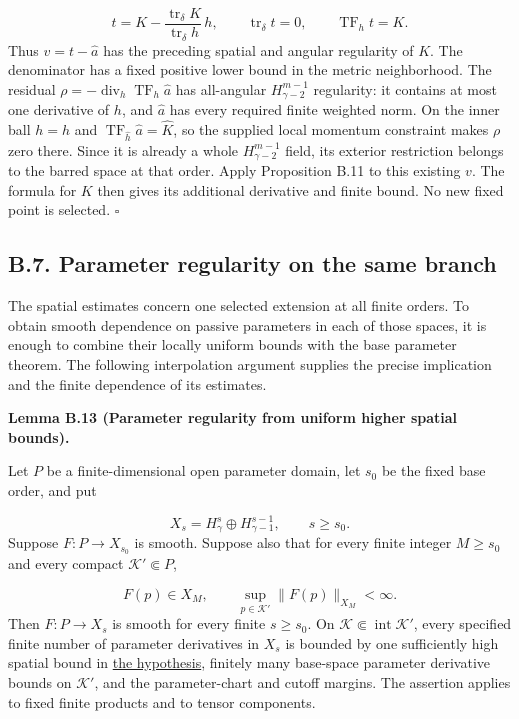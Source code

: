 \documentclass[
  english,
  11pt,
  reqno]{amsart}
\makeatletter
\newcommand{\pandocstatementheading}[1]{%
  \par\addpenalty{\@beginparpenalty}%
  \addvspace{.5\baselineskip plus .2\baselineskip minus .2\baselineskip}%
  {\normalfont\bfseries #1\par}%
  \nobreak\@afterindenttrue\@afterheading
}
\makeatother
\begin{document}
\label{eq:online-momentum-algebraic-inverse} \[
t=K-\frac{\operatorname{tr}_\delta K}
                  {\operatorname{tr}_\delta h}\,h,
\qquad \operatorname{tr}_\delta t=0,
\qquad \operatorname{TF}_h t=K.
\] Thus \(v=t-\widehat a\) has the preceding spatial and angular
regularity of \(K\). The denominator has a fixed positive lower bound in
the metric neighborhood. The residual
\(\rho=-\operatorname{div}_h\operatorname{TF}_h\widehat a\) has
all-angular \(H^{m-1}_{\gamma-2}\) regularity: it contains at most one
derivative of \(h\), and \(\widehat a\) has every required finite
weighted norm. On the inner ball \(h=\widehat h\) and
\(\operatorname{TF}_{\widehat h}\widehat a=\widehat K\), so the supplied
local momentum constraint makes \(\rho\) zero there. Since it is already
a whole \(H^{m-1}_{\gamma-2}\) field, its exterior restriction belongs
to the barred space at that order. Apply Proposition B.11 to this
existing \(v\). The formula for \(K\) then gives its additional
derivative and finite bound. No new fixed point is selected.
\hfill\(\square\)

\subsection{B.7. Parameter regularity on the same
branch}\label{b.7.-parameter-regularity-on-the-same-branch}\label{sec:online-parameter-promotion}

The spatial estimates concern one selected extension at all finite
orders. To obtain smooth dependence on passive parameters in each of
those spaces, it is enough to combine their locally uniform bounds with
the base parameter theorem. The following interpolation argument
supplies the precise implication and the finite dependence of its
estimates.

\pandocstatementheading{\leavevmode{}\label{lem:online-parameter-promotion}Lemma B.13 (Parameter regularity from uniform higher spatial bounds).}

Let \(P\) be a finite-dimensional open parameter domain, let \(s_0\) be
the fixed base order, and put

\label{eq:online-parameter-spatial-scale} \[
X_s=H^s_\gamma\oplus H^{s-1}_{\gamma-1},\qquad s\ge s_0.
\] Suppose \(F:P\to X_{s_0}\) is smooth. Suppose also that for every
finite integer \(M\ge s_0\) and every compact \(\mathcal K'\Subset P\),

\label{eq:online-parameter-higher-bounds} \[
F(p)\in X_M,\qquad
\sup_{p\in\mathcal K'}\|F(p)\|_{X_M}<\infty.
\] Then \(F:P\to X_s\) is smooth for every finite \(s\ge s_0\). On
\(\mathcal K\Subset\operatorname{int}\mathcal K'\), every specified
finite number of parameter derivatives in \(X_s\) is bounded by one
sufficiently high spatial bound in
\hyperref[eq:online-parameter-higher-bounds]{the hypothesis}, finitely
many base-space parameter derivative bounds on \(\mathcal K'\), and the
parameter-chart and cutoff margins. The assertion applies to fixed
finite products and to tensor components.
\end{document}
